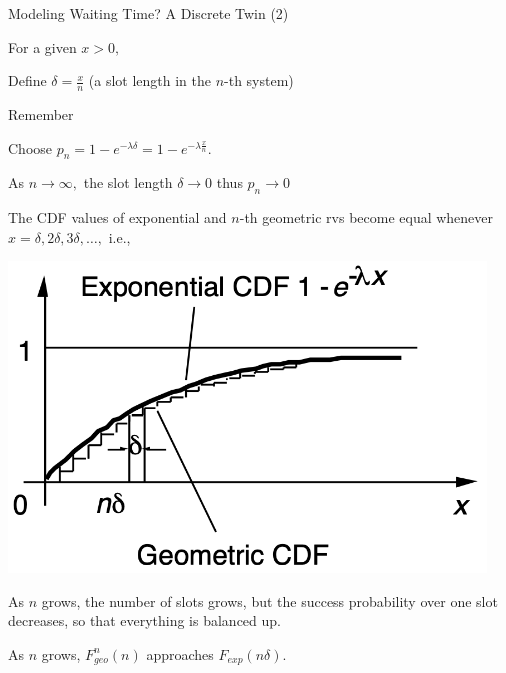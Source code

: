 \begin{frame}{Modeling Waiting Time? A Discrete Twin (2)}

{
For a given $x>0,$

\plitemsep 0.05in
\bci 
\item<2-> Define $\delta = \frac{x}{n}$ (a slot length in the $n$-th system)

\item<3-> Remember
\item<4-> Choose $p_n = 1-e^{-\lambda \delta} = 1-e^{-\lambda \frac{x}{n}}.$

\item<5-> As $n \rightarrow \infty,$ the slot length $\delta \rightarrow 0$ thus $p_n \rightarrow 0$ 

\item<5-> The CDF values of exponential and $n$-th geometric rvs become equal whenever $x =\delta, 2\delta, 3\delta, \ldots,$ i.e., 

\eci
}
{
\includegraphics[width=0.95\textwidth]{L4_exp_geo.png}
\small
\bci
\item<6-> As $n$ grows, the number of slots grows, but the success probability over one slot decreases, so that everything is balanced up. 
\item<7-> As $n$ grows, $F^n_{geo}(n)$ approaches $F_{exp}(n\delta).$
\eci
}
\end{frame}


